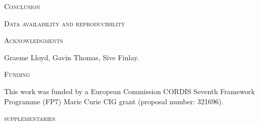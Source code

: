 \documentclass[12pt,letterpaper]{article}
\renewcommand{\section}[1]{%
\bigskip
\begin{center}
\begin{Large}
\normalfont\scshape #1
\medskip
\end{Large}
\end{center}}
\begin{document}

%
%

\section{Conclusion}



\section{Data availability and reproducibility}

\section{Acknowledgments}
Graeme Lloyd, Gavin Thomas, Sive Finlay.

\section{Funding} %
This work was funded by a European Commission CORDIS Seventh Framework Programme (FP7) Marie Curie CIG grant (proposal number: 321696).





\section{supplementaries}
\end{document}

